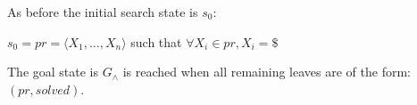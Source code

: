 \documentclass[11pt, oneside]{article}   	%
\begin{document}

\noindent As before the initial search state is $s_0$:

\noindent $s_0 = pr = \langle X_1, \dots, X_n \rangle $ such that $\forall X_i \in pr, X_i = \$ $ 

\noindent The goal state is $G_{\land}$ is reached when all remaining leaves are of the form: $(pr, solved)$.
\end{document}

